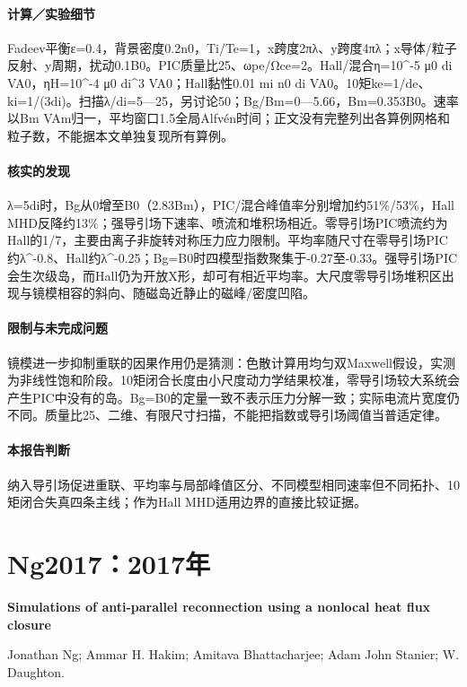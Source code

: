 \paragraph{计算／实验细节}Fadeev平衡ε=0.4，背景密度0.2n0，Ti/Te=1，x跨度2πλ、y跨度4πλ；x导体/粒子反射、y周期，扰动0.1B0。PIC质量比25、ωpe/Ωce=2。Hall/混合η=10\textasciicircum{}-5 μ0 di VA0，ηH=10\textasciicircum{}-4 μ0 di\textasciicircum{}3 VA0；Hall黏性0.01 mi n0 di VA0。10矩ke=1/de、ki=1/(3di)。扫描λ/di=5—25，另讨论50；Bg/Bm=0—5.66，Bm=0.353B0。速率以Bm VAm归一，平均窗口1.5全局Alfvén时间；正文没有完整列出各算例网格和粒子数，不能据本文单独复现所有算例。

\paragraph{核实的发现}λ=5di时，Bg从0增至B0（2.83Bm），PIC/混合峰值率分别增加约51\%/53\%，Hall MHD反降约13\%；强导引场下速率、喷流和堆积场相近。零导引场PIC喷流约为Hall的1/7，主要由离子非旋转对称压力应力限制。平均率随尺寸在零导引场PIC约λ\textasciicircum{}-0.8、Hall约λ\textasciicircum{}-0.25；Bg=B0时四模型指数聚集于-0.27至-0.33。强导引场PIC会生次级岛，而Hall仍为开放X形，却可有相近平均率。大尺度零导引场堆积区出现与镜模相容的斜向、随磁岛近静止的磁峰/密度凹陷。

\paragraph{限制与未完成问题}镜模进一步抑制重联的因果作用仍是猜测：色散计算用均匀双Maxwell假设，实测为非线性饱和阶段。10矩闭合长度由小尺度动力学结果校准，零导引场较大系统会产生PIC中没有的岛。Bg=B0的定量一致不表示压力分解一致；实际电流片宽度仍不同。质量比25、二维、有限尺寸扫描，不能把指数或导引场阈值当普适定律。

\paragraph{本报告判断}纳入导引场促进重联、平均率与局部峰值区分、不同模型相同速率但不同拓扑、10矩闭合失真四条主线；作为Hall MHD适用边界的直接比较证据。

\section{Ng2017：2017年}\label{paper:Ng2017}

\textbf{Simulations of anti-parallel reconnection using a nonlocal heat flux closure}\citep{Ng2017}\

Jonathan Ng;  Ammar H. Hakim;  Amitava Bhattacharjee;  Adam  John Stanier;  W. Daughton.

